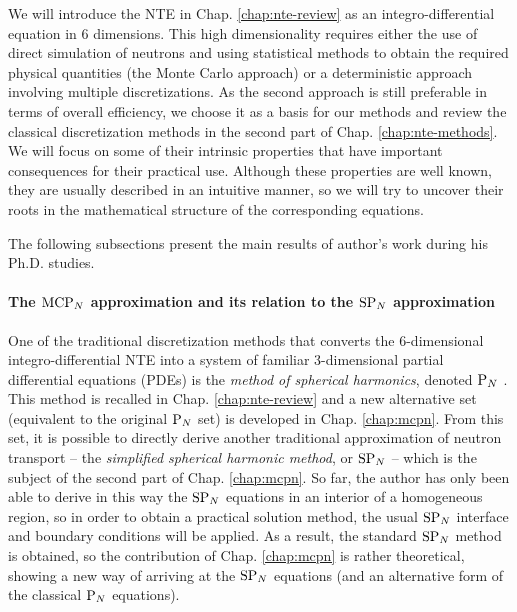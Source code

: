 We will introduce the NTE in Chap. \ref{chap:nte-review} as an integro-differential equation in 6 dimensions.
This high dimensionality requires either the use of direct simulation of neutrons and using statistical methods to obtain the
required physical quantities (the Monte Carlo approach) or a deterministic approach involving multiple discretizations.
As the second approach is still preferable in terms of overall efficiency, we choose it as a basis for our methods and
review the classical discretization methods in the second part of Chap. \ref{chap:nte-methods}. We will focus on some of
their intrinsic properties that have important consequences for their practical use. Although these properties are
well known, they are usually described in an intuitive manner, so we will try to uncover their roots in the mathematical
structure of the corresponding equations.

The following subsections present the main results of author's work during his Ph.D. studies.

\paragraph{The $\text{MCP}_{N}$ approximation and its relation to the $\text{SP}_{N}$ approximation} 
One of the traditional discretization methods that converts the 6-dimensional integro-differential NTE into a system of
familiar 3-dimensional partial differential equations (PDEs) is the
\textit{method of spherical harmonics}, denoted $\text{P}_{N}$ 
. This method is recalled in Chap.
\ref{chap:nte-review} and a new alternative set (equivalent to the original $\text{P}_{N}$ set) is developed in Chap.
\ref{chap:mcpn}. From this set, it is possible to directly derive another traditional approximation of neutron transport
-- the \textit{simplified spherical harmonic method}, or $\text{SP}_{N}$  -- which is the subject of the second part of Chap. \ref{chap:mcpn}. So far, the author has only
been able to derive in this way the $\text{SP}_{N}$ equations in an interior of a homogeneous region, so in order to obtain a
practical solution method, the usual $\text{SP}_{N}$ interface and boundary conditions will be applied. As a result, the standard
$\text{SP}_{N}$ method is obtained, so the contribution of Chap. \ref{chap:mcpn} is rather theoretical, showing a new way of
arriving at the $\text{SP}_{N}$ equations (and an alternative form of the classical $\text{P}_{N}$ equations).

